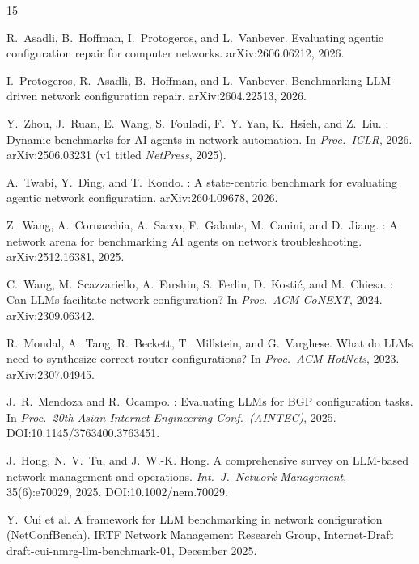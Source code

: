 \documentclass[11pt]{article}
\begin{document}
\begin{thebibliography}{15}\small

R.~Asadli, B.~Hoffman, I.~Protogeros, and L.~Vanbever.
\newblock Evaluating agentic configuration repair for computer networks.
\newblock arXiv:2606.06212, 2026.

I.~Protogeros, R.~Asadli, B.~Hoffman, and L.~Vanbever.
\newblock Benchmarking {LLM}-driven network configuration repair.
\newblock arXiv:2604.22513, 2026.

Y.~Zhou, J.~Ruan, E.~Wang, S.~Fouladi, F.~Y. Yan, K.~Hsieh, and Z.~Liu.
: Dynamic benchmarks for {AI} agents in network
automation.
\newblock In \emph{Proc.\ ICLR}, 2026. arXiv:2506.03231 (v1 titled
\emph{NetPress}, 2025).

A.~Twabi, Y.~Ding, and T.~Kondo.
: A state-centric benchmark for evaluating agentic
network configuration.
\newblock arXiv:2604.09678, 2026.

Z.~Wang, A.~Cornacchia, A.~Sacco, F.~Galante, M.~Canini, and D.~Jiang.
: A network arena for benchmarking {AI} agents on network
troubleshooting.
\newblock arXiv:2512.16381, 2025.

C.~Wang, M.~Scazzariello, A.~Farshin, S.~Ferlin, D.~Kosti\'c, and
M.~Chiesa.
: Can {LLMs} facilitate network configuration?
\newblock In \emph{Proc.\ ACM CoNEXT}, 2024. arXiv:2309.06342.

R.~Mondal, A.~Tang, R.~Beckett, T.~Millstein, and G.~Varghese.
\newblock What do {LLMs} need to synthesize correct router configurations?
\newblock In \emph{Proc.\ ACM HotNets}, 2023. arXiv:2307.04945.

J.~R.~Mendoza and R.~Ocampo.
: Evaluating {LLMs} for {BGP} configuration tasks.
\newblock In \emph{Proc.\ 20th Asian Internet Engineering Conf.\ (AINTEC)},
2025. DOI:10.1145/3763400.3763451.

J.~Hong, N.~V.~Tu, and J.~W.-K. Hong.
\newblock A comprehensive survey on {LLM}-based network management and
operations.
\newblock \emph{Int.\ J.\ Network Management}, 35(6):e70029, 2025.
DOI:10.1002/nem.70029.

Y.~Cui et al.
\newblock A framework for {LLM} benchmarking in network configuration
({NetConfBench}).
\newblock IRTF Network Management Research Group, Internet-Draft
draft-cui-nmrg-llm-benchmark-01, December 2025.


\end{thebibliography}
\end{document}
